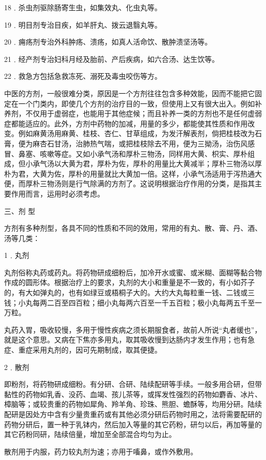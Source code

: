\documentclass[12pt,UTF8]{ctexbook}
\begin{document}
18﹒杀虫剂驱除肠寄生虫，如集效丸、化虫丸等。

19﹒明目剂专治目疾，如羊肝丸、拨云退翳丸等。

20﹒痈疡剂专治外科肿疡、溃疡，如真人活命饮、散肿溃坚汤等。

21﹒经产剂专治妇科月经及胎前、产后疾病，如六合汤、达生饮等。

22﹒救急方包括急救冻死、溺死及毒虫咬伤等方。

中医的方剂，一般很难分类，原因是一个方剂往往包含多种效能，因而不能把它固定在一个门类内，即使几个方剂的治疗目的一致，但使用上又有很大出入。例如补养剂，不仅用于虚弱症，也能用于其他症候；而且补养一类的方剂也不是任何虚弱症都能适应的。此外，方剂中药物的加减，用量的多少，都能使其性质和作用改变。例如麻黄汤用麻黄、桂枝、杏仁、甘草组成，为发汗解表剂，倘把桂枝改为石膏，便为麻杏石甘汤，治肺热气喘，或把桂枝除去不用，便为三拗汤，治伤风感冒、鼻塞、咳嗽等症。又如小承气汤和厚朴三物汤，同样用大黄、枳实、厚朴组成，但小承气汤以大黄为君，厚朴为佐，厚朴的用量比大黄减半；厚朴三物汤以厚朴为君，大黄为佐，厚朴的用量就比大黄加一倍。这样，小承气汤适用于泻热通大便，而厚朴三物汤则是行气除满的方剂了。这说明根据治疗作用的分类，是指其主要作用而言，运用时必须考虑。

三、剂 型

方剂有多种剂型，各具不同的性质和不同的效用，常用的有丸、散、膏、丹、酒、汤等几类：

1﹒丸剂

丸剂俗称丸药或药丸。将药物研成细粉后，加冷开水或蜜、或米糊、面糊等黏合物作成的圆形体。根据治疗上的要求，丸剂的大小和重量是不一致的，有小如芥子的，有大如弹丸的，也有如绿豆或梧桐子大的。大约大丸每粒重一钱、二钱或三钱；小丸每两二百至四百粒；细小丸每两六百至一千五百粒；极小丸每两五千至一万粒。

丸药入胃，吸收较慢，多用于慢性疾病之须长期服食者，故前人所说“丸者缓也”，就是这个意思。又病在下焦亦多用丸，取其吸收慢到达肠内才发生作用；也有急症、重症采用丸剂的，因可先期制成，取其便捷。

2﹒散剂

即粉剂，将药物研成细粉。有分研、合研、陆续配研等手续。一般多用合研，但带黏性的药物如乳香、没药、血竭、孩儿茶等，或挥发性强烈的药物如麝香、冰片、樟脑等；或较贵重的药物如犀角、羚羊角、珍珠、熊胆、蟾酥等，均用分研。陆续配研是因处方中含有少量贵重药或有其他必须分研后药物时用之，法将需要配研的药物分研后，置一种于乳钵内，然后加入等量的其它药粉，研匀以后，再加等量的其它药粉同研，陆续倍量，增加至全部混合均匀为止。

散剂用于内服，药力较丸剂为速；亦用于㗜鼻，或作外敷用。
\end{document}
